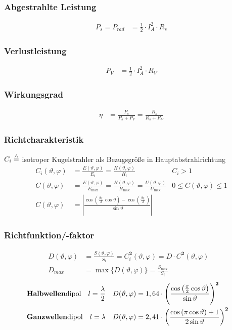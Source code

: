\subsubsection{Abgestrahlte Leistung}
\begin{align*}
    P_s = P_{rad} & = \frac{1}{2}\cdot I_A^2 \cdot R_s
\end{align*}
\subsubsection{Verlustleistung}
\begin{align*}
    P_V & = \frac{1}{2}\cdot I_A^2\cdot R_V
\end{align*}
\subsubsection{Wirkungsgrad}
\begin{align*}
    \eta & = \frac{P_s}{P_s + P_V} = \frac{R_s}{R_s + R_V}
\end{align*}

\subsubsection{Richtcharakteristik}
$C_{i} \stackrel{\wedge}{=}$ isotroper Kugelstrahler als Bezugsgröße in Hauptabstrahlrichtung
\begin{align*}
 	C_{i}(\vartheta, \varphi) & = \frac{E(\vartheta, \varphi)}{E_{i}}=\frac{H(\vartheta, \varphi)}{H_{i}}                                               & C_{i}>1\\
    C(\vartheta, \varphi)     & = \frac{E(\vartheta, \varphi)}{E_{\max}}=\frac{H(\vartheta, \varphi)}{H_{\max}} = \frac{U(\vartheta,\varphi)}{U_{\max}} & 0 \leq C(\vartheta, \varphi) \leq 1 \\
    C(\vartheta, \varphi) &= 
    \left|\frac{\cos\left(\frac{\beta L}{2}\cos\vartheta\right)-\cos\left(\frac{\beta L}{2}\right)}{\sin\vartheta}\right|
\end{align*}

\subsubsection{Richtfunktion/-faktor}
\begin{align*}
    D(\vartheta, \varphi) & = \frac{S(\vartheta, \varphi)}{S_{i}} = C^\mathbf{2}_i(\vartheta, \varphi) = D \cdot C^\mathbf{2}(\vartheta, \varphi) &\\
    D_{max} & = \max \{D(\vartheta, \varphi)\} = \frac{S_{\max}}{S_{i}}&
\end{align*}
\vspace{-0.5cm}
\begin{align*}
	&\text{\textbf{Halbwellen}dipol}\quad l=\frac{\lambda}{2} &D(\vartheta, \varphi) &= 1,64 \cdot  
	\left(\frac{\cos\left(\frac{\pi}{2}\cos\vartheta\right)}{\sin\vartheta}\right)^\mathbf{2}&\\
	&\text{\textbf{Ganzwellen}dipol}\quad l=\lambda &D(\vartheta, \varphi) &= 2,41 \cdot
	\left(\frac{\cos\left(\pi\cos\vartheta\right)+1}{2\sin\vartheta}\right)^\mathbf{2}&
\end{align*}


